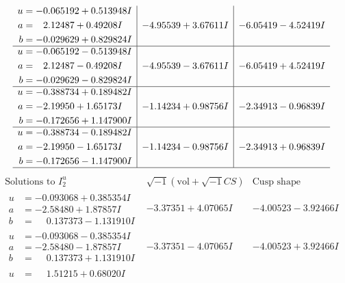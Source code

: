 \documentclass[1p]{elsarticle_modified}
\theoremstyle{definition}
\newcommand{\I}{\sqrt{-1}}
\begin{document}
$$\begin{array}{c|c|c}
\begin{aligned}
u &= -0.065192 + 0.513948 I \\
a &= \phantom{-}2.12487 + 0.49208 I \\
b &= -0.029629 + 0.829824 I\end{aligned}
 & -4.95539 + 3.67611 I & -6.05419 - 4.52419 I \\ \hline\begin{aligned}
u &= -0.065192 - 0.513948 I \\
a &= \phantom{-}2.12487 - 0.49208 I \\
b &= -0.029629 - 0.829824 I\end{aligned}
 & -4.95539 - 3.67611 I & -6.05419 + 4.52419 I \\ \hline\begin{aligned}
u &= -0.388734 + 0.189482 I \\
a &= -2.19950 + 1.65173 I \\
b &= -0.172656 + 1.147900 I\end{aligned}
 & -1.14234 + 0.98756 I & -2.34913 - 0.96839 I \\ \hline\begin{aligned}
u &= -0.388734 - 0.189482 I \\
a &= -2.19950 - 1.65173 I \\
b &= -0.172656 - 1.147900 I\end{aligned}
 & -1.14234 - 0.98756 I & -2.34913 + 0.96839 I\\
 \hline 
 \end{array}$$\newpage$$\begin{array}{c|c|c}  
\text{Solutions to }I^u_{2}& \I (\text{vol} + \sqrt{-1}CS) & \text{Cusp shape}\\
 \hline 
\begin{aligned}
u &= -0.093068 + 0.385354 I \\
a &= -2.58480 + 1.87857 I \\
b &= \phantom{-}0.137373 - 1.131910 I\end{aligned}
 & -3.37351 + 4.07065 I & -4.00523 - 3.92466 I \\ \hline\begin{aligned}
u &= -0.093068 - 0.385354 I \\
a &= -2.58480 - 1.87857 I \\
b &= \phantom{-}0.137373 + 1.131910 I\end{aligned}
 & -3.37351 - 4.07065 I & -4.00523 + 3.92466 I \\ \hline\begin{aligned}
u &= \phantom{-}1.51215 + 0.68020 I \\

\end{aligned}
\end{array}$$
\end{document}

